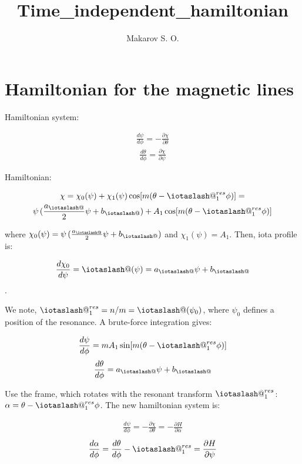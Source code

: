 \documentclass[11pt,a4paper,oneside]{article}
\author{Makarov S. O.}
\title{Time_independent_hamiltonian}
\makeatletter
\newcommand{\iotaslash}{{\mathpalette\iotaslash@\relax}}
\newcommand{\iotaslash@}[2]{
  \raisebox{-0.6\height}[0pt][0pt]{%
    \rotatebox[origin=Bl]{15}{$\m@th#1{\mkern-1mu\mathchar'26}$}%
  }%
  \mkern-9.5mu\nonscript\mkern-1mu
  \iota
  \mkern1mu
}
\makeatother
\begin{document}
\tableofcontents

\newpage

\section{Hamiltonian for the magnetic lines}

Hamiltonian system:

\begin{align}
\frac{d \psi}{d\phi}=-\frac{\partial \chi}{\partial\theta}
\end{align}
\begin{align}
\frac{d \theta}{d\phi}=\frac{\partial \chi}{\partial\psi}
\end{align}

Hamiltonian:

\begin{multline}
\chi=\chi_0(\psi)+\chi_1(\psi)\cos[m(\theta-\iotaslash^{res}_1\phi)]=\\
\psi\,(\frac{a_\iotaslash}{2}\psi+b_\iotaslash)+A_1\cos[m(\theta-\iotaslash^{res}_1\phi)]
\end{multline}

where $\chi_0(\psi)=\psi\,(\frac{a_\iotaslash}{2}\psi+b_\iotaslash)$ and $\chi_1(\psi)=A_1$. Then, iota profile is:

\begin{align}
\frac{d \chi_0}{d\psi}=\iotaslash(\psi)=a_\iotaslash\psi+b_\iotaslash
\end{align}.

We note, $\iotaslash^{res}_1=n/m=\iotaslash(\psi_0)$, where $\psi_0$ defines a position of the resonance.
A brute-force integration gives:

\begin{align}
\frac{d \psi}{d\phi}=mA_1\sin[m(\theta-\iotaslash^{res}_1\phi)]
\end{align}
\begin{align}
\frac{d \theta}{d\phi}=a_\iotaslash\psi+b_\iotaslash
\end{align}

Use the frame, which rotates with the resonant transform $\iotaslash^{res}_1$: $\alpha=\theta-\iotaslash^{res}_1\phi$. The new hamiltonian system is:

\begin{align}
\frac{d \psi}{d\phi}=-\frac{\partial \chi}{\partial\theta}=-\frac{\partial H}{\partial\alpha}
\end{align}
\begin{align}
\frac{d \alpha}{d\phi}=\frac{d \theta}{d\phi}-\iotaslash^{res}_1=\frac{\partial H}{\partial\psi}
\end{align}
\end{document}
